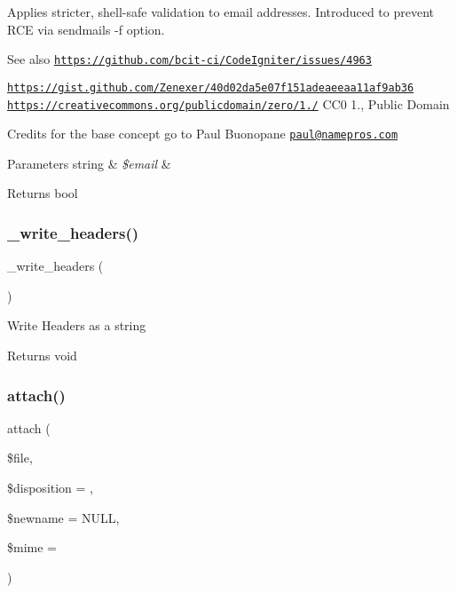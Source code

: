 Applies stricter, shell-\/safe validation to email addresses. Introduced to prevent R\+CE via sendmail\textquotesingle{}s -\/f option.

\begin{DoxySeeAlso}{See also}
\href{https://github.com/bcit-ci/CodeIgniter/issues/4963}{\tt https\+://github.\+com/bcit-\/ci/\+Code\+Igniter/issues/4963} 

\href{https://gist.github.com/Zenexer/40d02da5e07f151adeaeeaa11af9ab36}{\tt https\+://gist.\+github.\+com/\+Zenexer/40d02da5e07f151adeaeeaa11af9ab36}  \href{https://creativecommons.org/publicdomain/zero/1.0/}{\tt https\+://creativecommons.\+org/publicdomain/zero/1./} C\+C0 1., Public Domain
\end{DoxySeeAlso}
Credits for the base concept go to Paul Buonopane \href{mailto:paul@namepros.com}{\tt paul@namepros.\+com}


\begin{DoxyParams}[1]{Parameters}
string & {\em \$email} & \\
\hline
\end{DoxyParams}
\begin{DoxyReturn}{Returns}
bool 
\end{DoxyReturn}
\mbox{\label{class_c_i___email_a6bde7269215bc1093811ae098bb034bf}} 
\subsubsection{\texorpdfstring{\+\_\+write\+\_\+headers()}{\_write\_headers()}}
{\footnotesize\ttfamily \+\_\+write\+\_\+headers (\begin{DoxyParamCaption}{ }\end{DoxyParamCaption})\hspace{0.3cm}{\ttfamily [protected]}}

Write Headers as a string

\begin{DoxyReturn}{Returns}
void 
\end{DoxyReturn}
\mbox{\label{class_c_i___email_adb1bcf392d6cf38e3f94675a21cab563}} 
\subsubsection{\texorpdfstring{attach()}{attach()}}
{\footnotesize\ttfamily attach (\begin{DoxyParamCaption}\item[{}]{\$file,  }\item[{}]{\$disposition = {\ttfamily \textquotesingle{}\textquotesingle{}},  }\item[{}]{\$newname = {\ttfamily NULL},  }\item[{}]{\$mime = {\ttfamily \textquotesingle{}\textquotesingle{}} }\end{DoxyParamCaption})}

